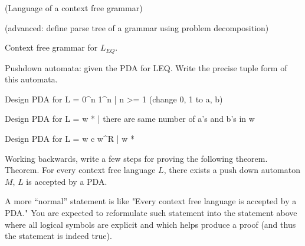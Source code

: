 \documentclass[12pt, letterpaper]{article}
\begin{document}
{(Language of a context free grammar) 

(advanced: define parse tree of a grammar using problem decomposition) 


Context free grammar for $L_{EQ}$. 

Pushdown automata: given the PDA for LEQ. Write the precise tuple form of this automata. 


Design PDA for L = {0^n 1^n | n >= 1} (change 0, 1 to a, b)

Design PDA for L = { w * | there are same number of a's and b's in w}

Design PDA for L = { w c w^R   | w * }

Working backwards, write a few steps for proving the following theorem. 
Theorem. For every context free language $L$, there exists a push down automaton $M$, $L$ is accepted by a PDA. 

A more ``normal'' statement is like "Every context free language is accepted by a PDA." You are expected to reformulate such statement into the statement above where all logical symbols are explicit and which helps produce a proof (and thus the statement is indeed true). 
}
\end{document}
